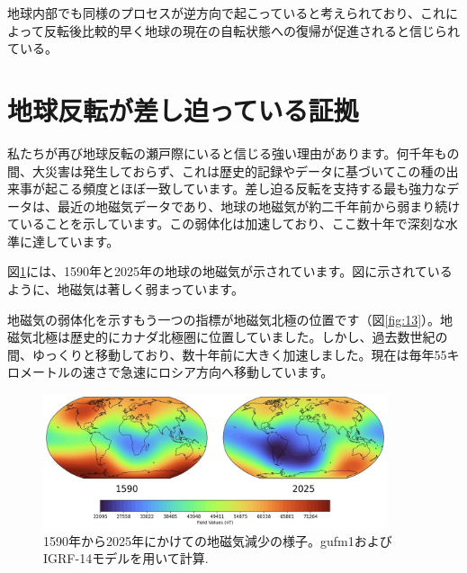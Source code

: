 \documentclass[10pt,twocolumn,letterpaper]{article}
\begin{document}
地球内部でも同様のプロセスが逆方向で起こっていると考えられており、これによって反転後比較的早く地球の現在の自転状態への復帰が促進されると信じられている。




\section{地球反転が差し迫っている証拠}

私たちが再び地球反転の瀬戸際にいると信じる強い理由があります。何千年もの間、大災害は発生しておらず、これは歴史的記録やデータに基づいてこの種の出来事が起こる頻度とほぼ一致しています。差し迫る反転を支持する最も強力なデータは、最近の地磁気データであり、地球の地磁気が約二千年前から弱まり続けていることを示しています。この弱体化は加速しており、ここ数十年で深刻な水準に達しています。

図\ref{fig:14}には、1590年と2025年の地球の地磁気が示されています\cite{125,126}。図に示されているように、地磁気は著しく弱まっています。

地磁気の弱体化を示すもう一つの指標が地磁気北極の位置です（図\ref{fig:13}）。地磁気北極は歴史的にカナダ北極圏に位置していました。しかし、過去数世紀の間、ゆっくりと移動しており、数十年前に大きく加速しました。現在は毎年55キロメートルの速さで急速にロシア方向へ移動しています\cite{124}。

\begin{figure}[t]
\begin{center}
\includegraphics[width=0.9\textwidth]{saa.jpg}
\end{center}
   \caption{1590年から2025年にかけての地磁気減少の様子。gufm1およびIGRF-14モデルを用いて計算\cite{125,126}.}
\label{fig:14}
\end{figure}
\end{document}

